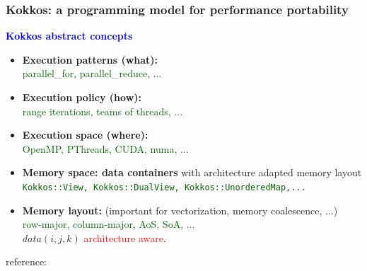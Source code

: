 \begin{frame}
  \frametitle{Kokkos: a programming model for performance portability}

  {\large \textcolor{blue}{\textbf{Kokkos abstract concepts}}}

  \begin{itemize}
  \item \textbf{Execution patterns (what):}\\
    \textcolor{darkgreen}{parallel\_for, parallel\_reduce, ...}
  \item \textbf{Execution policy (how):}\\
    \textcolor{darkgreen}{range iterations, teams of threads, ...}
  \item \textbf{Execution space (where):}\\
    \textcolor{darkgreen}{OpenMP, PThreads, CUDA, numa, ...}
  \item \textbf{Memory space: data containers} with architecture adapted memory layout\\
    {\small \textcolor{darkgreen}{\texttt{Kokkos::View, Kokkos::DualView, Kokkos::UnorderedMap,...}}}
  \item \textbf{Memory layout:} (important for vectorization, memory coalescence, ...)\\
    \textcolor{darkgreen}{row-major, column-major, AoS, SoA, ...}\\
    $data(i,j,k)$ \textcolor{red}{architecture aware}.
  \end{itemize}
  
  {\scriptsize reference: }

\end{frame}


